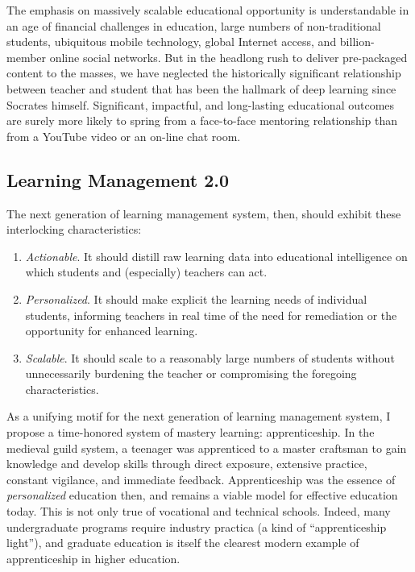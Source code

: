 \documentclass{article}
\begin{document}
The emphasis on massively scalable educational opportunity
is understandable in an age of
financial challenges in education,
large numbers of non-tradi\-tional students,
ubiquitous mobile tech\-nology,
global Internet access,
and billion-member online social networks.
But in the headlong rush to deliver pre-packaged content to the masses,
we have neglected the historically significant relationship
between teacher and student that has been the hallmark
of deep learning since Socrates himself.
Significant, impactful, and long-lasting educational
outcomes are surely more likely to spring
from a face-to-face mentoring relationship than
from a YouTube video or an on-line chat room.

\subsection{Learning Management 2.0}
\label{sec:lms-2.0}

The next generation of learning management system, then,
should exhibit these interlocking characteristics:
\begin{enumerate}
\item \emph{Actionable}. It should distill raw learning data
  into educational intelligence on which students
  and (especially) teachers can act.
\item \emph{Personalized}. It should make explicit
  the learning needs of individual students,
  informing teachers in real time of the need for remediation
  or the opportunity for enhanced learning.
\item \emph{Scalable}. It should scale to a reasonably large numbers of students
  without unnecessarily burdening the teacher
  or compromising the foregoing characteristics.
\end{enumerate}

As a unifying motif for the next generation of learning management system,
I propose a time-honored system of mastery learning: apprenticeship.
In the medieval guild system,
a teenager was apprenticed to a master craftsman
to gain knowledge and develop skills through
direct exposure,
extensive practice,
constant vigilance,
and immediate feedback.
Apprenticeship was the essence of \emph{personalized} education then,
and remains a viable model for effective education today.
This is not only true of vocational and technical schools.
Indeed, many undergraduate programs require
industry practica (a kind of ``apprenticeship light''),
and graduate education is itself the clearest modern example of apprenticeship
in higher education.
\end{document}

